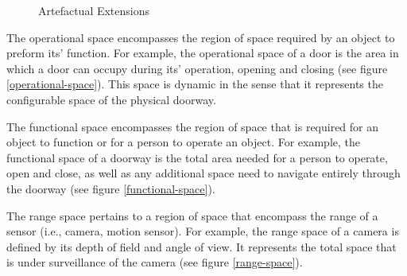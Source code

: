 \documentclass[12pt]{ucthesis}
\begin{document}
\begin{figure}[H]
 \centering
 \hspace{7 mm}
  \hspace{7 mm}
 \caption{Artefactual Extensions}
\label{artefactual-extensions}
\end{figure}

The operational space encompasses the region of space required by an object to preform its' function. For example, the operational space of a door is the area in which a door can occupy during its' operation, opening and closing (see figure \ref{operational-space}). This space is dynamic in the sense that it represents the configurable space of the physical doorway. 

The functional space encompasses the region of space that is required for an object to function or for a person to operate an object. For example, the functional space of a doorway is the total area needed for a person to operate, open and close, as well as any additional space need to navigate entirely through the doorway (see figure \ref{functional-space}). 

The range space pertains to a region of space that encompass the range of a sensor (i.e., camera, motion sensor). For example, the range space of a camera is defined by its depth of field and angle of view. It represents the total space that is under surveillance of the camera (see figure \ref{range-space}).
\end{document}
